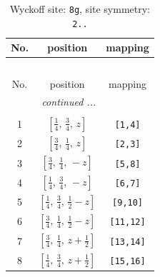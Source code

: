 \documentclass[fleqn,8pt]{jsarticle}
\begin{document}
\renewcommand{\arraystretch}{1.2}
\begin{longtable}{ccc}
\caption{Wyckoff site: {\tt 8g}, site symmetry: {\tt 2..}}
 \\
 \hline \hline
No. & position & mapping \\ \hline \endfirsthead

\multicolumn{2}{l}{\tablename\ \thetable{}} \\
 \hline \hline
No. & position & mapping \\ \hline \endhead

 \hline \hline
\multicolumn{2}{r}{\footnotesize\it continued ...} \\ \endfoot

 \hline \hline
\multicolumn{2}{r}{} \\ \endlastfoot

1 & $\left[ \frac{1}{4},\, \frac{3}{4},\, z \right]$ & {\tt [1,4]} \\ \hline
2 & $\left[ \frac{3}{4},\, \frac{1}{4},\, z \right]$ & {\tt [2,3]} \\ \hline
3 & $\left[ \frac{3}{4},\, \frac{1}{4},\, - z \right]$ & {\tt [5,8]} \\ \hline
4 & $\left[ \frac{1}{4},\, \frac{3}{4},\, - z \right]$ & {\tt [6,7]} \\ \hline
5 & $\left[ \frac{1}{4},\, \frac{3}{4},\, \frac{1}{2} - z \right]$ & {\tt [9,10]} \\ \hline
6 & $\left[ \frac{3}{4},\, \frac{1}{4},\, \frac{1}{2} - z \right]$ & {\tt [11,12]} \\ \hline
7 & $\left[ \frac{3}{4},\, \frac{1}{4},\, z + \frac{1}{2} \right]$ & {\tt [13,14]} \\ \hline
8 & $\left[ \frac{1}{4},\, \frac{3}{4},\, z + \frac{1}{2} \right]$ & {\tt [15,16]} \\
\end{longtable}
\renewcommand{\arraystretch}{1.2}
\end{document}
